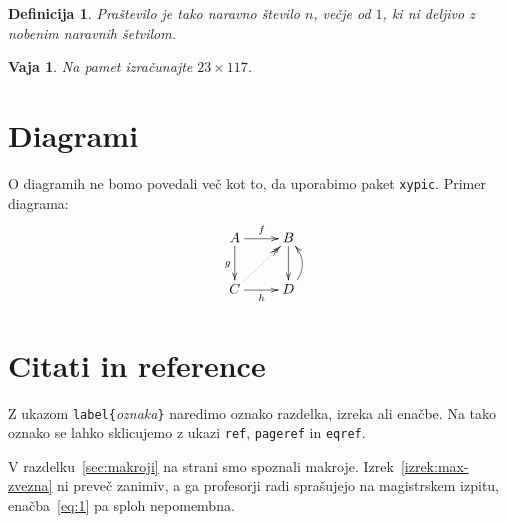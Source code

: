 \documentclass{amsart}
\newtheorem{vaja}[izrek]{Vaja}
\newtheorem{definicija}{Definicija}
\begin{document}
\begin{definicija}
  \emph{Praštevilo} je tako naravno število $n$, večje od $1$, ki ni deljivo z nobenim
  naravnih šetvilom.
\end{definicija}

\begin{vaja}
  Na pamet izračunajte $23 \times 117$.
\end{vaja}

\section{Diagrami}
\label{sec:diagrami}

O diagramih ne bomo povedali več kot to, da uporabimo paket \texttt{xypic}. Primer diagrama:
%
\begin{equation*}
  \xymatrix{
    {A}
    \ar[r]^{f}
    \ar[d]_{g}
    &
    {B}
    \ar[d]
    \\
    {C}
    \ar[r]_{h}
    \ar@{.>>}[ru]
    &
    {D}
    \ar@/_1em/[u]
  }
\end{equation*}

\section{Citati in reference}
\label{sec:citati}

Z ukazom \verb|label{|\emph{oznaka}\verb|}| naredimo oznako razdelka, izreka ali enačbe. Na tako oznako se lahko sklicujemo z ukazi \verb|ref|, \verb|pageref| in \verb|eqref|.

V razdelku~\ref{sec:makroji} na strani \pageref{sec:makroji} smo spoznali makroje.
Izrek~\ref{izrek:max-zvezna} ni preveč zanimiv, a ga profesorji radi sprašujejo na
magistrskem izpitu, enačba~\eqref{eq:1} pa sploh nepomembna.
\end{document}
